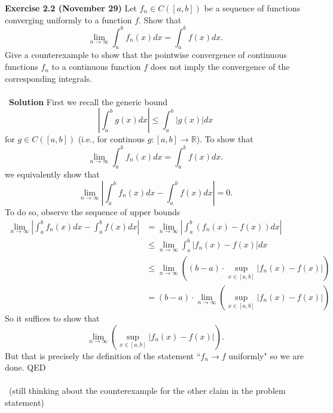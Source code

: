 \documentclass[12 pt]{article}
\newcommand{\R}{\mathbb{R}}
\newcommand{\LP}{\left(}
\newcommand{\RP}{\right)}
\numberwithin{equation}{section}
\begin{document}
\textbf{Exercise 2.2 (November 29)} Let $f_n \in C([a,b])$ be a sequence of functions converging uniformly to a function $f$. Show that \begin{equation*}
\lim_{n \to \infty} \int_a ^b f_n(x)dx = \int_a ^b f(x)dx.
\end{equation*}
Give a counterexample to show that the pointwise convergence of continuous functions $f_n$ to a continuous function $f$ does not imply the convergence of the corresponding integrals.\\
\\
\
\textbf{Solution} First we recall the generic bound \begin{equation*}
\left| \int_a^b g(x) dx \right| \leq \int_a ^b |g(x)|dx
\end{equation*}
for $g \in C([a,b])$ (i.e., for continous $g: [a,b] \to \R$). To show that \begin{equation*}
\lim_{n \to \infty} \int_a ^b f_n(x)dx = \int_a ^b f(x)dx.
\end{equation*}
we equivalently show that \begin{equation*}
\lim_{n \to \infty} \left| \int_a ^b f_n(x)dx - \int_a ^b f(x)dx \right| = 0.
\end{equation*}
To do so, observe the sequence of upper bounds \begin{align*}
\lim_{n \to \infty} \left| \int_a ^b f_n(x)dx - \int_a ^b f(x)dx \right| & = \lim_{n \to \infty} \left| \int_a ^b \LP f_n(x) - f(x)\RP dx\right| \\
\ & \leq \lim_{n \to \infty} \int_a ^b \left| f_n(x) - f(x) \right|dx \\
\ & \leq \lim_{n \to \infty} \LP (b - a) \cdot \sup_{x \in [a,b]} |f_n(x) - f(x)| \RP \\
\ & = (b-a) \cdot  \lim_{n \to \infty} \LP \sup_{x \in [a,b]} |f_n(x) - f(x)| \RP 
\end{align*}
So it suffices to show that \begin{equation*}
 \lim_{n \to \infty} \LP \sup_{x \in [a,b]} |f_n(x) - f(x)| \RP.
\end{equation*}
But that is precisely the definition of the statement ``$f_n \to f$ uniformly" so we are done. QED\\
\\
\
(still thinking about the counterexample for the other claim in the problem statement)
\end{document}
